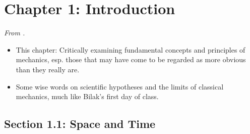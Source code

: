 \documentclass[../notes.tex]{subfiles}
\begin{document}
\section{Chapter 1: Introduction}
\emph{From \textcite{bib:KibbleBerkshire}.}
\begin{itemize}
    \item {}This chapter: Critically examining fundamental concepts and principles of mechanics, esp. those that may have come to be regarded as more obvious than they really are.
    \item Some wise words on scientific hypotheses and the limits of classical mechanics, much like Bilak's first day of class.
\end{itemize}


\subsection*{Section 1.1: Space and Time}
\end{document}
